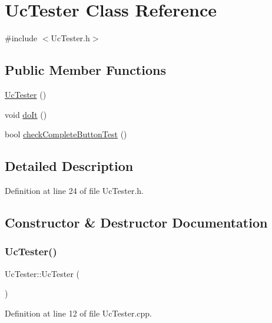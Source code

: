 \hypertarget{class_uc_tester}{}\section{Uc\+Tester Class Reference}
\label{class_uc_tester}


{\ttfamily \#include $<$Uc\+Tester.\+h$>$}

\subsection*{Public Member Functions}
\begin{DoxyCompactItemize}
\item 
\hyperlink{class_uc_tester_aaf34725a5d436fe36e38019db73c8bc2}{Uc\+Tester} ()
\item 
void \hyperlink{class_uc_tester_a69f5d786369de873a3ec6cb367b990cb}{do\+It} ()
\item 
bool \hyperlink{class_uc_tester_a00d49661f31d159e2873a179e6f60eb8}{check\+Complete\+Button\+Test} ()
\end{DoxyCompactItemize}


\subsection{Detailed Description}


Definition at line 24 of file Uc\+Tester.\+h.



\subsection{Constructor \& Destructor Documentation}
\mbox{\label{class_uc_tester_aaf34725a5d436fe36e38019db73c8bc2}} 
\subsubsection{\texorpdfstring{Uc\+Tester()}{UcTester()}}
{\footnotesize\ttfamily Uc\+Tester\+::\+Uc\+Tester (\begin{DoxyParamCaption}{ }\end{DoxyParamCaption})}



Definition at line 12 of file Uc\+Tester.\+cpp.



